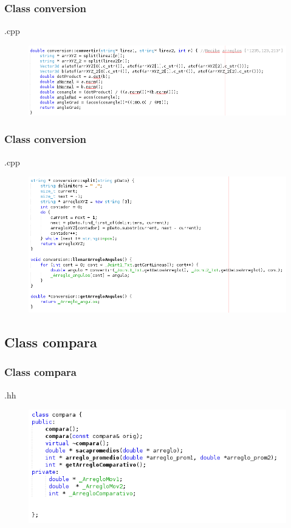 \documentclass{beamer}
\begin{document}
\begin{frame}
\frametitle{Class conversion}
.cpp

\begin{figure}
\includegraphics[width=1\linewidth]{17.png}
\end{figure}


\end{frame}


\begin{frame}
\frametitle{Class conversion}
.cpp

\begin{figure}
\includegraphics[width=0.8\linewidth]{18.png}
\end{figure}


\end{frame}


\subsection{Class compara}

\begin{frame}
\frametitle{Class compara}
.hh

\begin{figure}
\includegraphics[width=0.7\linewidth]{19.png}
\end{figure}


\end{frame}
\end{document}
